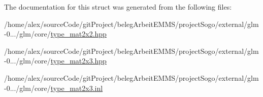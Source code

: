 The documentation for this struct was generated from the following files\-:\begin{DoxyCompactItemize}
\item 
/home/alex/source\-Code/git\-Project/beleg\-Arbeit\-E\-M\-M\-S/project\-Sogo/external/glm-\/0.../glm/core/\hyperlink{type__mat2x2_8hpp}{type\-\_\-mat2x2.\-hpp}\item 
/home/alex/source\-Code/git\-Project/beleg\-Arbeit\-E\-M\-M\-S/project\-Sogo/external/glm-\/0.../glm/core/\hyperlink{type__mat2x3_8hpp}{type\-\_\-mat2x3.\-hpp}\item 
/home/alex/source\-Code/git\-Project/beleg\-Arbeit\-E\-M\-M\-S/project\-Sogo/external/glm-\/0.../glm/core/\hyperlink{type__mat2x3_8inl}{type\-\_\-mat2x3.\-inl}\end{DoxyCompactItemize}
